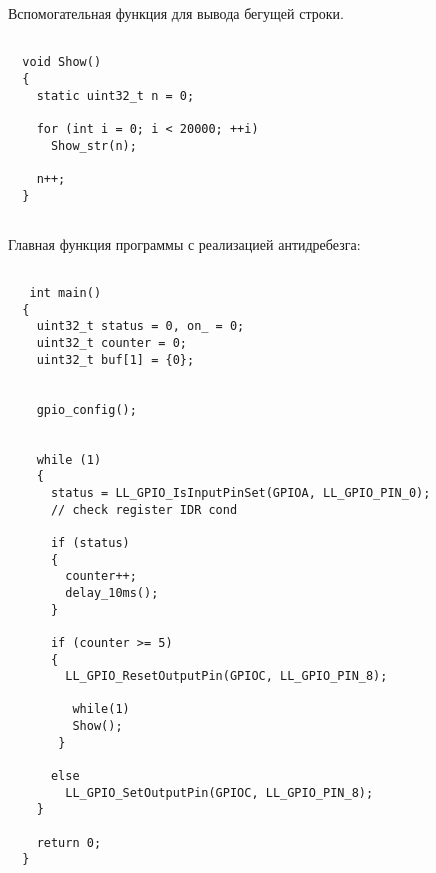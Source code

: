   Вспомогательная функция для вывода бегущей строки.
  \begin{verbatim}
      
  void Show()
  {
    static uint32_t n = 0;
    
    for (int i = 0; i < 20000; ++i)
      Show_str(n);
    
    n++;
  }
  
  \end{verbatim}
  
  
  Главная функция программы с реализацией антидребезга:
  
  \begin{verbatim}
  
   int main()
  {
    uint32_t status = 0, on_ = 0;
    uint32_t counter = 0;
    uint32_t buf[1] = {0};
  
    
    gpio_config();
  
    
    while (1)
    {
      status = LL_GPIO_IsInputPinSet(GPIOA, LL_GPIO_PIN_0); 
      // check register IDR cond
   
      if (status)
      {
        counter++; 
        delay_10ms();
      }
          
      if (counter >= 5)
      {
        LL_GPIO_ResetOutputPin(GPIOC, LL_GPIO_PIN_8);
          
         while(1)
         Show();
       }
     
      else
        LL_GPIO_SetOutputPin(GPIOC, LL_GPIO_PIN_8);
    } 
    
    return 0;
  }
  
  
  \end{verbatim}
  